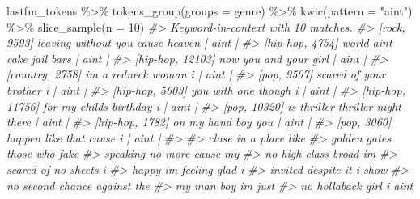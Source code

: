 \documentclass[
]{article}
\newenvironment{Shaded}{\begin{snugshade}}{\end{snugshade}}
\newcommand{\AttributeTok}[1]{\textcolor[rgb]{0.77,0.63,0.00}{#1}}
\newcommand{\CommentTok}[1]{\textcolor[rgb]{0.56,0.35,0.01}{\textit{#1}}}
\newcommand{\DecValTok}[1]{\textcolor[rgb]{0.00,0.00,0.81}{#1}}
\newcommand{\FunctionTok}[1]{\textcolor[rgb]{0.00,0.00,0.00}{#1}}
\newcommand{\NormalTok}[1]{#1}
\newcommand{\SpecialCharTok}[1]{\textcolor[rgb]{0.00,0.00,0.00}{#1}}
\newcommand{\StringTok}[1]{\textcolor[rgb]{0.31,0.60,0.02}{#1}}
\begin{document}
\begin{Shaded}
\begin{Highlighting}[]
\NormalTok{lastfm\_tokens }\SpecialCharTok{\%\textgreater{}\%}
    \FunctionTok{tokens\_group}\NormalTok{(}\AttributeTok{groups =}\NormalTok{ genre) }\SpecialCharTok{\%\textgreater{}\%}
    \FunctionTok{kwic}\NormalTok{(}\AttributeTok{pattern =} \StringTok{"ain\textquotesingle{}t"}\NormalTok{) }\SpecialCharTok{\%\textgreater{}\%}
    \FunctionTok{slice\_sample}\NormalTok{(}\AttributeTok{n =} \DecValTok{10}\NormalTok{)}
\CommentTok{\#\textgreater{} Keyword{-}in{-}context with 10 matches.                                                            }
\CommentTok{\#\textgreater{}      [rock, 9593] leaving without you cause heaven | ain\textquotesingle{}t |}
\CommentTok{\#\textgreater{}   [hip{-}hop, 4754]       world ain\textquotesingle{}t cake jail bars | ain\textquotesingle{}t |}
\CommentTok{\#\textgreater{}  [hip{-}hop, 12103]            now you and your girl | ain\textquotesingle{}t |}
\CommentTok{\#\textgreater{}   [country, 2758]            i\textquotesingle{}m a redneck woman i | ain\textquotesingle{}t |}
\CommentTok{\#\textgreater{}       [pop, 9507]         scared of your brother i | ain\textquotesingle{}t |}
\CommentTok{\#\textgreater{}   [hip{-}hop, 5603]            you with one though i | ain\textquotesingle{}t |}
\CommentTok{\#\textgreater{}  [hip{-}hop, 11756]        for my child\textquotesingle{}s birthday i | ain\textquotesingle{}t |}
\CommentTok{\#\textgreater{}      [pop, 10320] is thriller thriller night there | ain\textquotesingle{}t |}
\CommentTok{\#\textgreater{}   [hip{-}hop, 1782]               on my hand boy you | ain\textquotesingle{}t |}
\CommentTok{\#\textgreater{}       [pop, 3060]         happen like that cause i | ain\textquotesingle{}t |}
\CommentTok{\#\textgreater{}                              }
\CommentTok{\#\textgreater{}  close in a place like       }
\CommentTok{\#\textgreater{}  golden gates those who fake }
\CommentTok{\#\textgreater{}  speaking no more cause my   }
\CommentTok{\#\textgreater{}  no high class broad i\textquotesingle{}m     }
\CommentTok{\#\textgreater{}  scared of no sheets i       }
\CommentTok{\#\textgreater{}  happy i\textquotesingle{}m feeling glad i    }
\CommentTok{\#\textgreater{}  invited despite it i show   }
\CommentTok{\#\textgreater{}  no second chance against the}
\CommentTok{\#\textgreater{}  my man boy i\textquotesingle{}m just         }
\CommentTok{\#\textgreater{}  no hollaback girl i ain\textquotesingle{}t}
\end{Highlighting}
\end{Shaded}
\end{document}
